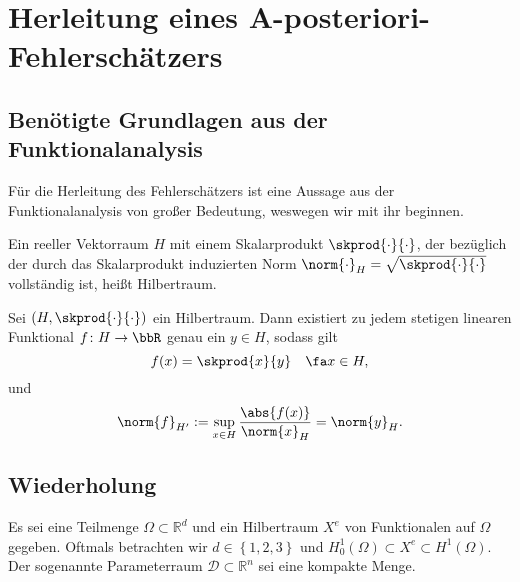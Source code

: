 
\section{Herleitung eines A-posteriori-Fehlerschätzers} %
\label{sec:herleitung}


\subsection{Benötigte Grundlagen aus der Funktionalanalysis} %
\label{sub:ben_tigte_grundlagen_aus_der_funktionalanalysis}

Für die Herleitung des Fehlerschätzers ist eine Aussage aus der Funktionalanalysis von großer Bedeutung, weswegen wir mit ihr beginnen.

\begin{Definition}[Hilbertraum]
    \label{def:hilbertraum}
    Ein reeller Vektorraum $H$ mit einem Skalarprodukt $\skprod{\cdot}{\cdot}$, der bezüglich der durch das Skalarprodukt induzierten Norm $\norm{\cdot}_H = \sqrt{\skprod{\cdot}{\cdot}}$ vollständig ist, heißt Hilbertraum.
\end{Definition}

\begin{Satz}
    \label{satz:rieszscher_darstellungssatz}
    Sei $(H, \skprod{\cdot}{\cdot})$ ein Hilbertraum. Dann existiert zu jedem stetigen linearen Funktional $f \colon H \to \bbR$ genau ein $y \in H$, sodass gilt
    \begin{equation}
        f(x) = \skprod{x}{y} \quad \fa x \in H,
    \end{equation}
    und
    \begin{equation}
         \norm{f}_{H'} := \sup_{x \in H} \frac{\abs{f(x)}}{\norm{x}_H} = \norm{y}_H.
    \end{equation}
\end{Satz}

\subsection{Wiederholung} %
\label{sub:wiederholung}

Es sei eine Teilmenge $\Omega \subset \mathbb{R}^d$ und ein Hilbertraum $X^e$ von Funktionalen auf $\Omega$ gegeben.
Oftmals betrachten wir $d \in \left\{ 1, 2, 3 \right\}$ und $H^1_0(\Omega) \subset X^e \subset H^1(\Omega)$.
Der sogenannte Parameterraum $\mathcal D \subset \mathbb{R}^n$ sei eine kompakte Menge.

